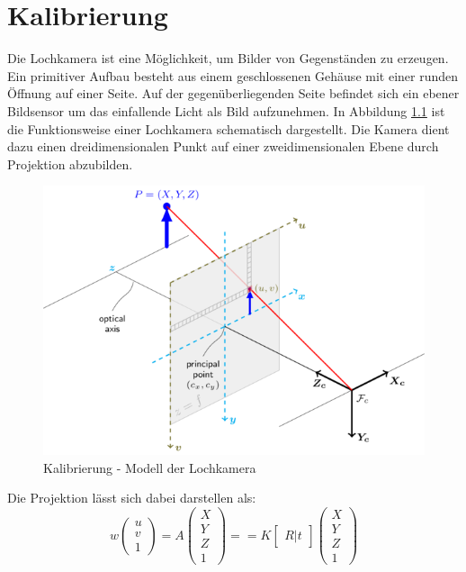 \chapter{Kalibrierung}

Die Lochkamera ist eine M\"oglichkeit, um Bilder von Gegenst\"anden zu erzeugen. Ein primitiver Aufbau besteht aus einem geschlossenen Geh\"ause mit einer runden \"Offnung auf einer Seite. Auf der gegen\"uberliegenden Seite befindet sich ein ebener Bildsensor um das einfallende Licht als Bild aufzunehmen. In Abbildung \ref{fig:calibration_pinhole} ist die Funktionsweise einer Lochkamera schematisch dargestellt. Die Kamera dient dazu einen dreidimensionalen Punkt auf einer zweidimensionalen Ebene durch Projektion abzubilden.



\begin{figure}
 \centering
 \includegraphics[width=1\textwidth]{media/calibration/pinhole_camera_model.png}
 \caption{Kalibrierung - Modell der Lochkamera}
 \label{fig:calibration_pinhole}
\end{figure}

Die Projektion l\"asst sich dabei darstellen als:
\begin{equation}
 w
 \begin{pmatrix}
  u \\ v \\ 1
 \end{pmatrix}
 = A \begin{pmatrix}
    X \\ Y \\ Z \\ 1
   \end{pmatrix}
   =
 = K \begin{bmatrix}
      R | t
     \end{bmatrix}
   \begin{pmatrix}
    X \\ Y \\ Z \\ 1
   \end{pmatrix}
\end{equation}

